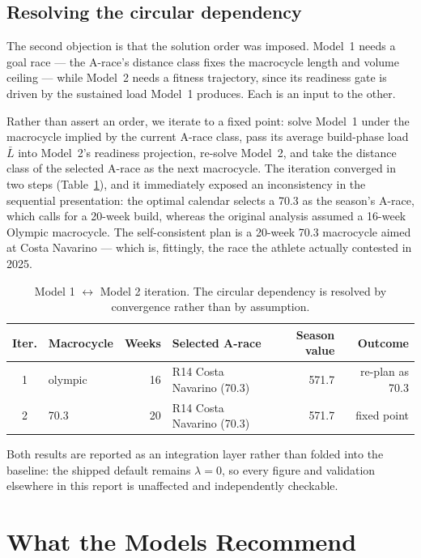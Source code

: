 \documentclass[11pt,a4paper]{article}
\begin{document}
\subsection{Resolving the circular dependency}

The second objection is that the solution order was imposed. Model~1 needs a
goal race --- the A-race's distance class fixes the macrocycle length and
volume ceiling --- while Model~2 needs a fitness trajectory, since its readiness
gate is driven by the sustained load Model~1 produces. Each is an input to the
other.

Rather than assert an order, we iterate to a fixed point: solve Model~1 under
the macrocycle implied by the current A-race class, pass its average build-phase
load $\bar L$ into Model~2's readiness projection, re-solve Model~2, and take
the distance class of the selected A-race as the next macrocycle. The iteration
converged in two steps (Table~\ref{tab:loop}), and it immediately exposed an
inconsistency in the sequential presentation: the optimal calendar selects a
70.3 as the season's A-race, which calls for a 20-week build, whereas the
original analysis assumed a 16-week Olympic macrocycle. The self-consistent
plan is a 20-week 70.3 macrocycle aimed at Costa Navarino --- which is, fittingly,
the race the athlete actually contested in 2025.

\begin{table}[h]
\centering\small
\begin{tabular}{clrlrr}
\toprule
Iter. & Macrocycle & Weeks & Selected A-race & Season value & Outcome\\
\midrule
1 & olympic & 16 & R14 Costa Navarino (70.3) & 571.7 & re-plan as 70.3\\
2 & 70.3 & 20 & R14 Costa Navarino (70.3) & 571.7 & fixed point\\
\bottomrule
\end{tabular}
\caption{Model 1 $\leftrightarrow$ Model 2 iteration. The circular dependency
is resolved by convergence rather than by assumption.}
\label{tab:loop}
\end{table}

Both results are reported as an integration layer rather than folded into the
baseline: the shipped default remains $\lambda = 0$, so every figure and
validation elsewhere in this report is unaffected and independently checkable.

\section{What the Models Recommend}
\label{sec:recommendations}
\end{document}
